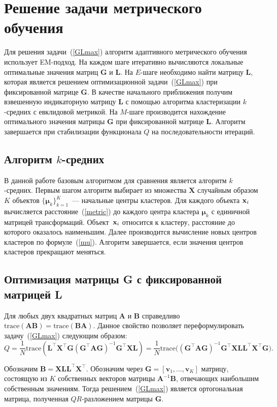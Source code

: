 \section{Решение задачи метрического обучения}
Для решения задачи~(\ref{GLmax}) алгоритм адаптивного метрического обучения использует \mbox{EM-под}\-ход.
На каждом шаге итеративно вычисляются локальные оптимальные значения матриц $\mathbf{G}$ и $\mathbf{L}$.
На $E$-шаге необходимо найти матрицу $\mathbf{L}$, которая является решением оптимизационной задачи~(\ref{GLmax}) при фиксированной матрице $\mathbf{G}$.
В качестве начального приближения получим взвешенную индикаторную матрицу $\mathbf{L}$ с помощью алгоритма кластеризации $k$-средних с евклидовой метрикой.
На $M$-шаге производится нахождение оптимального значения матрицы $\mathbf{G}$ при фиксированной матрице $\mathbf{L}$.
Алгоритм завершается при стабилизации функционала $Q$ на последовательности итераций.

\subsection{Алгоритм $k$-средних}
В данной работе базовым алгоритмом для сравнения является алгоритм $k$-средних.
Первым шагом алгоритм выбирает из множества $\mathbf{X}$ случайным образом $K$ объектов $\{\boldsymbol{\mu}_k\}_{k=1}^K$~--- начальные центры кластеров.
Для каждого объекта $\mathbf{x}_i$ вычисляется расстояние~(\ref{metric}) до каждого центра кластера $\boldsymbol{\mu}_k$ с единичной матрицей трансформаций.
Объект~$\mathbf{x}_i$ относится к кластеру, расстояние до которого оказалось наименьшим.
Далее производится вычисление новых центров кластеров по формуле~(\ref{mu}).
Алгоритм завершается, если значения центров кластеров прекращают меняться.

\subsection{Оптимизация матрицы G с фиксированной матрицей L}
Для любых двух квадратных матриц $\mathbf{A}$ и $\mathbf{B}$ справедливо $\text{trace}(\mathbf{AB}) = \text{trace}(\mathbf{BA})$.
Данное свойство позволяет переформулировать задачу~(\ref{GLmax}) следующим образом:
\[
Q = \frac 1N \text{trace} (\mathbf{L}^{\top} \mathbf{X}^{\top} \mathbf{G} (\mathbf{G}^{\top} \mathbf{A G})^{-1} \mathbf{G}^{\top} \mathbf{X L}) = \frac 1N \text{trace} \bigl((\mathbf{G}^{\top} \mathbf{A G})^{-1} \mathbf{G}^{\top} \mathbf{X L L}^{\top} \mathbf{X}^{\top} \mathbf{G}\bigr).
\]
\begin{theorem}
	Обозначим $\mathbf{B} = \mathbf{X L L}^{\top} \mathbf{X}^{\top}$.
	Обозначим через $\mathbf{G} = [\mathbf{v}_1, \ldots, \mathbf{v}_K]$ матрицу, состоящую из $K$ собственных векторов матрицы $\mathbf{A}^{-1}\mathbf{B}$, отвечающих наибольшим собственным значениям.
	Тогда решением~(\ref{GLmax}) является ортогональная матрица, полученная $QR$-раз\-ло\-же\-ни\-ем матрицы $\mathbf{G}$.
\end{theorem}


